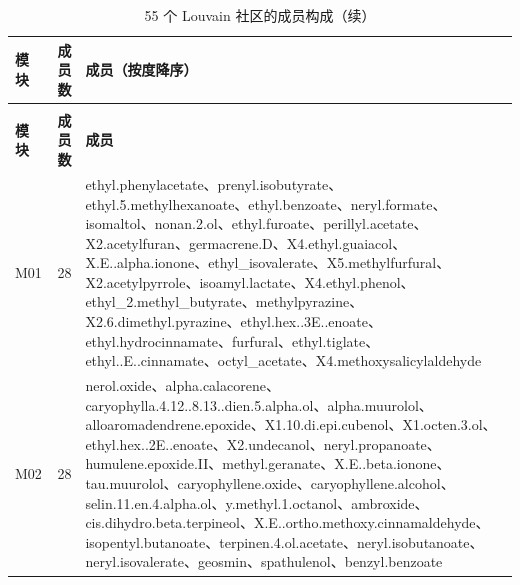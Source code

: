 \begin{longtable}{@{}l r p{}@{}}
\caption{55 个 Louvain 社区的成员构成（$\rho=0.5$，211 节点）}\\
\toprule
\textbf{模块} & \textbf{成员数} & \textbf{成员（按度降序）} \\
\endfirsthead
\caption*{55 个 Louvain 社区的成员构成（续）}\\
\toprule
\textbf{模块} & \textbf{成员数} & \textbf{成员} \\
\endhead
\bottomrule
\endlastfoot
M01 & 28 & ethyl.\allowbreak{}phenylacetate、prenyl.\allowbreak{}isobutyrate、ethyl.\allowbreak{}5.\allowbreak{}methylhexanoate、ethyl.\allowbreak{}benzoate、neryl.\allowbreak{}formate、isomaltol、nonan.\allowbreak{}2.\allowbreak{}ol、ethyl.\allowbreak{}furoate、perillyl.\allowbreak{}acetate、X2.\allowbreak{}acetylfuran、germacrene.\allowbreak{}D、X4.\allowbreak{}ethyl.\allowbreak{}guaiacol、X.\allowbreak{}E.\allowbreak{}.\allowbreak{}alpha.\allowbreak{}ionone、ethyl\_isovalerate、X5.\allowbreak{}methylfurfural、X2.\allowbreak{}acetylpyrrole、isoamyl.\allowbreak{}lactate、X4.\allowbreak{}ethyl.\allowbreak{}phenol、ethyl\_2.\allowbreak{}methyl\_butyrate、methylpyrazine、X2.\allowbreak{}6.\allowbreak{}dimethyl.\allowbreak{}pyrazine、ethyl.\allowbreak{}hex.\allowbreak{}.\allowbreak{}3E.\allowbreak{}.\allowbreak{}enoate、ethyl.\allowbreak{}hydrocinnamate、furfural、ethyl.\allowbreak{}tiglate、ethyl.\allowbreak{}.\allowbreak{}E.\allowbreak{}.\allowbreak{}cinnamate、octyl\_acetate、X4.\allowbreak{}methoxysalicylaldehyde \\
M02 & 28 & nerol.\allowbreak{}oxide、alpha.\allowbreak{}calacorene、caryophylla.\allowbreak{}4.\allowbreak{}12.\allowbreak{}.\allowbreak{}8.\allowbreak{}13.\allowbreak{}.\allowbreak{}dien.\allowbreak{}5.\allowbreak{}alpha.\allowbreak{}ol、alpha.\allowbreak{}muurolol、alloaromadendrene.\allowbreak{}epoxide、X1.\allowbreak{}10.\allowbreak{}di.\allowbreak{}epi.\allowbreak{}cubenol、X1.\allowbreak{}octen.\allowbreak{}3.\allowbreak{}ol、ethyl.\allowbreak{}hex.\allowbreak{}.\allowbreak{}2E.\allowbreak{}.\allowbreak{}enoate、X2.\allowbreak{}undecanol、neryl.\allowbreak{}propanoate、humulene.\allowbreak{}epoxide.\allowbreak{}II、methyl.\allowbreak{}geranate、X.\allowbreak{}E.\allowbreak{}.\allowbreak{}beta.\allowbreak{}ionone、tau.\allowbreak{}muurolol、caryophyllene.\allowbreak{}oxide、caryophyllene.\allowbreak{}alcohol、selin.\allowbreak{}11.\allowbreak{}en.\allowbreak{}4.\allowbreak{}alpha.\allowbreak{}ol、y.\allowbreak{}methyl.\allowbreak{}1.\allowbreak{}octanol、ambroxide、cis.\allowbreak{}dihydro.\allowbreak{}beta.\allowbreak{}terpineol、X.\allowbreak{}E.\allowbreak{}.\allowbreak{}ortho.\allowbreak{}methoxy.\allowbreak{}cinnamaldehyde、isopentyl.\allowbreak{}butanoate、terpinen.\allowbreak{}4.\allowbreak{}ol.\allowbreak{}acetate、neryl.\allowbreak{}isobutanoate、neryl.\allowbreak{}isovalerate、geosmin、spathulenol、benzyl.\allowbreak{}benzoate \\

\end{longtable}
